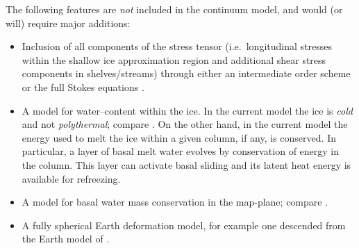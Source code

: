 \documentclass[11pt,final]{amsart}
\begin{document}
The following features are \emph{not} included in the continuum model, and would (or will) require major additions:
\begin{itemize}
\item Inclusion of all components of the stress tensor (i.e.~longitudinal stresses within the shallow ice approximation region and additional shear stress components in shelves/streams) through either an intermediate order scheme \cite{Blatter,SaitoEISMINT} or the full Stokes equations \cite{Fowler}.
\item A model for water--content within the ice.  In the current model the ice is \emph{cold} and not \emph{polythermal}; compare \cite{Greve}.  On the other hand, in the current model the energy used to melt the ice within a given column, if any, is conserved.  In particular, a layer of basal melt water evolves by conservation of energy in the column.  This layer can activate basal sliding and its latent heat energy is available for refreezing.
\item A model for basal water mass conservation in the map-plane; compare \cite{JohnsonFastook}.
\item A fully spherical Earth deformation model, for example one descended from the Earth model of \cite{Peltier}.
\end{itemize}
\end{document}
